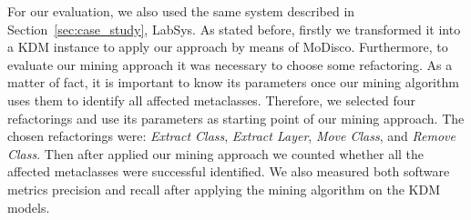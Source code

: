 For our evaluation, we also used the same system described in Section~\ref{sec:case_study}, LabSys. As stated before, firstly we transformed it into a KDM instance to apply our approach by means of MoDisco. %
%
%
%
%
Furthermore, to evaluate our mining approach it was necessary to choose some refactoring. As a matter of fact, it is important to know its parameters once our mining algorithm uses them to identify all affected metaclasses. Therefore, we selected four refactorings and use its parameters as starting point of our mining approach. The chosen refactorings were: \textit{Extract Class}, \textit{Extract Layer}, \textit{Move Class}, and \textit{Remove Class}. %
%
%
%
Then after applied our mining approach we counted whether all the affected metaclasses were successful identified.%
We also measured both software metrics precision and recall after applying the mining algorithm on the KDM models.


